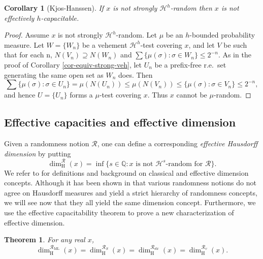 \documentclass[11pt,reqno]{article}
\theoremstyle{plain}
\newtheorem{thm}{Theorem}
\newtheorem*{cor*}{Corollary}
\theoremstyle{definition}
\theoremstyle{remark}
\numberwithin{equation}{section}
\newcommand{\Rat}{\ensuremath{\mathbb{Q}}}
\newcommand{\Acyl}[1]{\ensuremath{N(#1)}}
\newcommand{\Hmeas}{\ensuremath{\mathcal{H}}}
\newcommand{\Hm}[1]{\ensuremath{\Hmeas^{#1}}}
\newcommand{\Hdim}[1][\mbox{}]{\ensuremath{\dim^{#1}_{\operatorname{H}}}}
\begin{document}
\begin{cor*}[Kjos-Hanssen]
	If $x$ is not strongly $\Hm{h}$-random then $x$ is not effectively $h$-capacitable.
\end{cor*}

\begin{proof}
	Assume $x$ is not strongly $\Hm{h}$-random. Let $\mu$ be an $h$-bounded probability measure. Let $W = \{W_n\}$ be a vehement $\Hm{h}$-test covering $x$, and let $V$ be such that for each n, $\Acyl{V_n} \supseteq \Acyl{W_n}$ and $\sum \{\mu(\sigma)\colon \sigma \in W_n\} \leq 2^{-n}$. As in the proof of Corollary \ref{cor-equiv-strong-veh}, let $U_n$ be a prefix-free r.e.\ set generating the same open set as $W_n$ does. Then
	\[
		\sum \{\mu(\sigma)\colon \sigma \in U_n\} = \mu(\Acyl{U_n}) \leq \mu(\Acyl{V_n}) \leq \{\mu(\sigma)\colon \sigma \in V_n\}  \leq 2^{-n},
	\]
	and hence $U = \{U_n\}$ forms a $\mu$-test covering $x$. Thus $x$ cannot be $\mu$-random.
 \end{proof}



% 
% 
\subsection{Effective capacities and effective dimension} \label{ssec-cap-dim}
	
Given a randomness notion $\mathcal{R}$, one can define a corresponding \emph{effective Hausdorff dimension} by putting
\[
	\Hdim[\mathcal{R}](x) = \inf\{s \in \Rat\colon x \text{ is  not $\Hm{s}$-random for $\mathcal{R}$} \}.
\]		
We refer to \citep{falconer:1990, mattila:1995, lutz:2003, reimann:2004, hitchcock-lutz-mayordomo:2005} for definitions and background on classical and effective dimension concepts. 
Although it has been shown in \citep{reimann-stephan:2005} that various randomness notions do not agree on Hausdorff measures and yield a strict hierarchy of randomness concepts, we will see now that they all yield the same dimension concept. Furthermore, we use the effective capacitability theorem to prove a new characterization of effective dimension.

\begin{thm}
	For any real $x$,
	\[
		\Hdim[\mathcal{R}_{\operatorname{ML}}](x) = \Hdim[\mathcal{R}_S](x) = \Hdim[\mathcal{R}_{\operatorname{str}}](x) = \Hdim[\mathcal{R}_{v}](x).
	\]
\end{thm}
\end{document}
